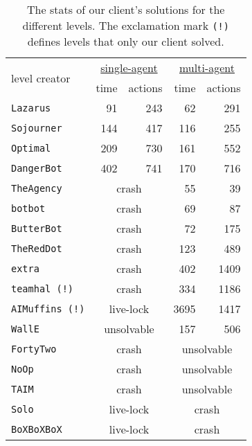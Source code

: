 
\begin{table}
  \centering
  \begin{tabular}{lrrrr}
    \toprule
    \multirow{2}{*}{level creator} & \multicolumn{2}{c}{\underline{single-agent}} & \multicolumn{2}{c}{\underline{multi-agent}} \\
                                   & time & actions & time & actions \\ \midrule
    \texttt{Lazarus}              & 91  & 243 & 62   & 291 \\
    \texttt{Sojourner}            & 144 & 417 & 116  & 255 \\
    \texttt{Optimal}              & 209 & 730 & 161  & 552 \\
    \texttt{DangerBot}            & 402 & 741 & 170  & 716 \\
    \texttt{TheAgency}            & \multicolumn{2}{c}{crash}      & 55   & 39 \\ 
    \texttt{botbot}               & \multicolumn{2}{c}{crash}      & 69   & 87 \\
    \texttt{ButterBot}            & \multicolumn{2}{c}{crash}      & 72   & 175 \\
    \texttt{TheRedDot}            & \multicolumn{2}{c}{crash}      & 123  & 489 \\ 
    \texttt{extra}                & \multicolumn{2}{c}{crash}      & 402  & 1409 \\
    \texttt{teamhal \hfill(!)}    & \multicolumn{2}{c}{crash}      & 334  & 1186 \\ 
    \texttt{AIMuffins \hfill(!)}  & \multicolumn{2}{c}{live-lock}  & 3695 & 1417 \\ 
    \texttt{WallE}                & \multicolumn{2}{c}{unsolvable} & 157  & 506 \\
    \texttt{FortyTwo}             & \multicolumn{2}{c}{crash}      & \multicolumn{2}{c}{unsolvable} \\
    \texttt{NoOp}                 & \multicolumn{2}{c}{crash}      & \multicolumn{2}{c}{unsolvable} \\
    \texttt{TAIM}                 & \multicolumn{2}{c}{crash}      & \multicolumn{2}{c}{unsolvable} \\
    \texttt{Solo}                 & \multicolumn{2}{c}{live-lock}  & \multicolumn{2}{c}{crash}      \\
    \texttt{BoXBoXBoX}            & \multicolumn{2}{c}{live-lock}  & \multicolumn{2}{c}{crash}      \\
    \bottomrule
  \end{tabular}
  \caption{\label{tab:competition results}The stats of our client's solutions for the different levels. The exclamation mark \texttt{(!)} defines levels that only our client solved.}
\end{table}
